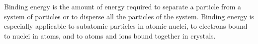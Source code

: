 
   {Binding energy is the amount of energy required to separate a particle from a system of particles or to disperse all the particles of the system. Binding energy is especially applicable to subatomic particles in atomic nuclei, to electrons bound to nuclei in atoms, and to atoms and ions bound together in crystals.
}
